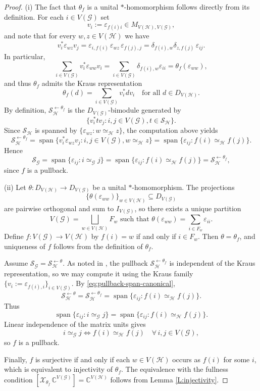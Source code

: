 \documentclass[11pt]{amsart}
\numberwithin{equation}{section}
\theoremstyle{plain}
\theoremstyle{definition}
\theoremstyle{remark}
\newcommand{\G}{{\mathcal{G}}}
\renewcommand{\H}{{\mathcal{H}}}
\renewcommand{\S}{{\mathcal{S}}}
\newcommand{\X}{{\mathcal{X}}}
\newcommand{\eps}{\varepsilon}
\def\de{\delta}
\newcommand{\bC}{\mathbb{C}}
\newcommand{\spn}{\operatorname{span}}
\begin{document}
\begin{proof}
(i) The fact that $\theta_f$ is a unital $*$-homomorphism follows directly from its definition. 
For each $i\in V(\G)$ set
\[
v_i:=\eps_{f(i) i}\in M_{V(\H),V(\G)},
\]
and note that for every $w,z \in V(\H)$ we have
\[
v_i^*\eps_{wz}v_j
=\eps_{i,f(i)}\,\eps_{wz}\,\eps_{f(j),j}
=\de_{f(i),w}\de_{z,f(j)}\,\eps_{ij}.
\]
In particular,
\[
\sum_{i\in V(\G)} v_i^* \eps_{ww} v_i
=
\sum_{i\in V(\G)} \de_{f(i),w}\varepsilon_{ii}=\theta_f(\eps_{ww}),
\]
and thus $\theta_f$ admits the Kraus representation
\[
\theta_f(d)=\sum_{i\in V(\G)} v_i^* d v_i
\quad \text{for all } d \in D_{V(\H)}.
\]
By definition, $\S_\H^{\leftarrow\theta_f}$ is the $D_{V(\G)}$-bimodule generated by
\[
\{v_i^* t v_j: i,j\in V(\G), t\in \S_\H\}.
\]
Since $\S_\H$ is spanned by $\{\eps_{wz}: w\simeq_\H z\}$, the computation above yields
\begin{equation}\label{eq:pullback-span-canonical}
\S_\H^{\leftarrow\theta_f}
=
\spn\{v_i^* \eps_{wz} v_j : i,j\in V(\G), w\simeq_\H z\}
=
\spn\{\eps_{ij}: f(i)\simeq_\H f(j)\}.
\end{equation}
Hence
\[
\S_\G
=
\spn\{\eps_{ij}: i\simeq_\G j\}
=
\spn\{\eps_{ij}: f(i)\simeq_\H f(j)\}
=
\S_\H^{\leftarrow\theta_f},
\]
since $f$ is a pullback.

\medskip
\noindent
(ii) Let $\theta \colon D_{V(\H)}\to D_{V(\G)}$ be a unital $*$-homomorphism.
The projections 
\[
\{\theta(\eps_{ww})\}_{w\in V(\H)}\subseteq D_{V(\G)}
\]
are pairwise orthogonal and sum to $I_{V(\G)}$, so there exists a unique partition
\[
V(\G)=\bigsqcup_{w\in V(\H)} F_w
\text{ such that }
\theta(\eps_{ww})
=
\sum_{i\in F_w} \eps_{ii}.
\]
Define $f \colon V(\G)\to V(\H)$ by $f(i)=w$ if and only if $i\in F_w$. 
Then $\theta=\theta_f$, and uniqueness of $f$ follows from the definition of $\theta_f$.

Assume $\S_\G=\S_\H^{\leftarrow\theta}$. As noted in \cite{Daws24}, the pullback $\S_\H^{\leftarrow\theta_f}$ is independent of the Kraus representation, so we may compute it using the Kraus family $\{v_i:=\eps_{f(i),i}\}_{i\in V(\G)}$. By \eqref{eq:pullback-span-canonical},
\[
\S_\H^{\leftarrow\theta}
=
\S_\H^{\leftarrow\theta_f}
=
\spn\{\eps_{ij}: f(i)\simeq_\H f(j)\}.
\]
Thus
\[
\spn\{\eps_{ij}: i\simeq_\G j\}
=
\spn\{\eps_{ij}: f(i)\simeq_\H f(j)\}.
\]
Linear independence of the matrix units gives
\[
i\simeq_\G j \iff f(i)\simeq_\H f(j)
\quad \forall\, i,j\in V(\G),
\]
so $f$ is a pullback.

Finally, $f$ is surjective if and only if each $w\in V(\H)$ occurs as $f(i)$ for some $i$, which is equivalent to injectivity of $\theta_f$. The equivalence with the fullness condition $[\X_{\theta_f}\,\bC^{V(\G)}]=\bC^{V(\H)}$ follows from Lemma \ref{L:injectivity}.
\end{proof}
\end{document}
